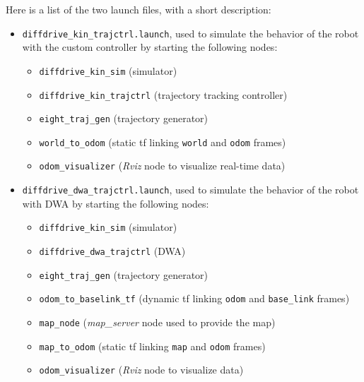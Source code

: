 \documentclass[11pt,a4paper]{article}
\begin{document}
Here is a list of the two launch files, with a short description:\\
\begin{itemize}
    \item \texttt{diffdrive\_kin\_trajctrl.launch}, used to simulate the behavior of the robot
            with the custom controller by starting the following nodes:
        \begin{itemize}
            \item \texttt{diffdrive\_kin\_sim} (simulator)
            \item \texttt{diffdrive\_kin\_trajctrl} (trajectory tracking controller)
            \item \texttt{eight\_traj\_gen} (trajectory generator)
            \item \texttt{world\_to\_odom} (static tf linking \texttt{world} and \texttt{odom} frames)
            \item \texttt{odom\_visualizer} (\textit{Rviz} node to visualize real-time data)\\
        \end{itemize}

    \item \texttt{diffdrive\_dwa\_trajctrl.launch}, used to simulate the behavior of the robot
            with DWA by starting the following nodes:
        \begin{itemize}
            \item \texttt{diffdrive\_kin\_sim} (simulator)
            \item \texttt{diffdrive\_dwa\_trajctrl} (DWA)
            \item \texttt{eight\_traj\_gen} (trajectory generator)
            \item \texttt{odom\_to\_baselink\_tf} (dynamic tf linking \texttt{odom} and \texttt{base\_link} frames)
            \item \texttt{map\_node} (\textit{map\_server} node used to provide the map)
            \item \texttt{map\_to\_odom} (static tf linking \texttt{map} and \texttt{odom} frames)
            \item \texttt{odom\_visualizer} (\textit{Rviz} node to visualize data)
        \end{itemize}
\end{itemize}
\end{document}
